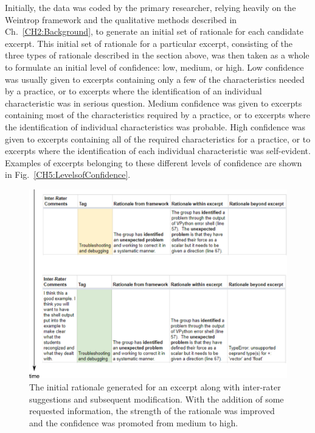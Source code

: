 \documentclass{msuphddissertation}
\begin{document}
\begin{doublespace}
Initially, the data was coded by the primary researcher, relying heavily on the Weintrop framework and the qualitative methods described in Ch.~\ref{CH2:Background}, to generate an initial set of rationale for each candidate excerpt.  This initial set of rationale for a particular excerpt, consisting of the three types of rationale described in the section above, was then taken as a whole to formulate an initial level of confidence: low, medium, or high.  Low confidence was usually given to excerpts containing only a few of the characteristics needed by a practice, or to excerpts where the identification of an individual characteristic was in serious question.  Medium confidence was given to excerpts containing most of the characteristics required by a practice, or to excerpts where the identification of individual characteristics was probable.  High confidence was given to excerpts containing all of the required characteristics for a practice, or to excerpts where the identification of each individual characteristic was self-evident.  Examples of excerpts belonging to these different levels of confidence are shown in Fig.~\ref{CH5:LevelsofConfidence}.

\begin{figure}\centering
\includegraphics[scale=0.65]{./images/CH5Reliability.pdf}
\caption{The initial rationale generated for an excerpt along with inter-rater suggestions and subsequent modification.  With the addition of some requested information, the strength of the rationale was improved and the confidence was promoted from medium to high.}\label{CH5:Reliability}
\end{figure}


\end{doublespace}
\end{document}
